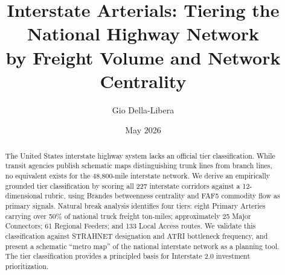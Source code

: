 \documentclass[12pt]{article}
\title{Interstate Arterials: Tiering the National Highway Network\\
       by Freight Volume and Network Centrality}
\author{Gio Della-Libera}
\date{May 2026}
\begin{document}
\maketitle

\begin{abstract}
The United States interstate highway system lacks an official tier classification. While transit agencies publish schematic maps distinguishing trunk lines from branch lines, no equivalent exists for the 48,800-mile interstate network. We derive an empirically grounded tier classification by scoring all 227 interstate corridors against a 12-dimensional rubric, using Brandes betweenness centrality and FAF5 commodity flow as primary signals. Natural break analysis identifies four tiers: eight Primary Arteries carrying over 50\% of national truck freight ton-miles; approximately 25 Major Connectors; 61 Regional Feeders; and 133 Local Access routes. We validate this classification against STRAHNET designation and ATRI bottleneck frequency, and present a schematic ``metro map'' of the national interstate network as a planning tool. The tier classification provides a principled basis for Interstate 2.0 investment prioritization.
\end{abstract}












\end{document}

